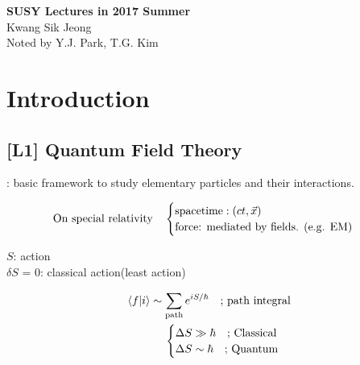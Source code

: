 \documentclass[11pt,letterpaper]{article}
\begin{document}


\begin{center}
{\Huge \bfseries SUSY Lectures in 2017 Summer}\\[10mm]
Kwang Sik Jeong \footnotemark[1] \\
\VS
{\SM Noted by Y.J. Park, T.G. Kim} 
\end{center}


    

\tableofcontents

\newpage

\section{Introduction}

\subsection{[L1] Quantum Field Theory}

    : basic framework to study elementary particles and their interactions.

\begin{center}
{\color{blue}{"special relativity + Quantum mechanics"}}
\end{center}

%
\begin{equation*}
 \textnormal{On special relativity} \quad
 \begin{cases}
  \textnormal{spacetime}: (ct,\vec{x}) \\
  \textnormal{force: mediated by fields. (e.g. EM)}
 \end{cases}
\end{equation*}


$S$: action \\
$\delta S$ = 0: classical action(least action)

\begin{align*}
 \braket{f|i} \sim \sum_{\text{path}}e^{iS/\hbar} \quad \textnormal{; path integral} \\
 \begin{cases}
  \Delta S \gg \hbar \quad \textnormal{; Classical} \\
  \Delta S \sim \hbar \quad \textnormal{; Quantum}
 \end{cases}
\end{align*}

%
\end{document}
